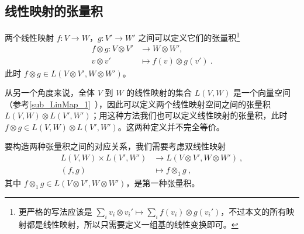 
\begin{issues}
\issueTODO
{}
\end{issues}


\subsection{线性映射的张量积}

两个线性映射 $f: V \to W$，$g: V' \to W'$ 之间可以定义它们的张量积\footnote{更严格的写法应该是 $\sum_i v_i \otimes v_i' \mapsto \sum_i f(v_i) \otimes g(v_i')$，不过本文的所有映射都是线性映射，所以只需要定义一组基的线性变换即可。}
\begin{equation}
\begin{aligned}
f \otimes g: V \otimes V' &\to W \otimes W', \\
v \otimes v' &\mapsto f(v) \otimes g(v')~.
\end{aligned}
\end{equation}
此时 $f \otimes g \in L(V \otimes V', W \otimes W')$。




从另一个角度来说，全体 $V$ 到 $W$ 的线性映射的集合 $L(V, W)$ 是一个向量空间（参考\autoref{sub_LinMap_1}~），因此可以定义两个线性映射空间之间的张量积 $L(V, W) \otimes L(V', W')$；用这种方法我们也可以定义线性映射的张量积，此时 $f \otimes g \in L(V, W) \otimes L(V', W')$。这两种定义并不完全等价。

要构造两种张量积之间的对应关系，我们需要考虑双线性映射
\begin{equation}
\begin{aligned}
L(V, W) \times L(V', W') &\to L(V \otimes V', W \otimes W')~, \\
(f, g) &\mapsto f \otimes_1 g~,
\end{aligned}
\end{equation}
其中 $f \otimes_1 g \in L(V \otimes V', W \otimes W')$，是第一种张量积。

